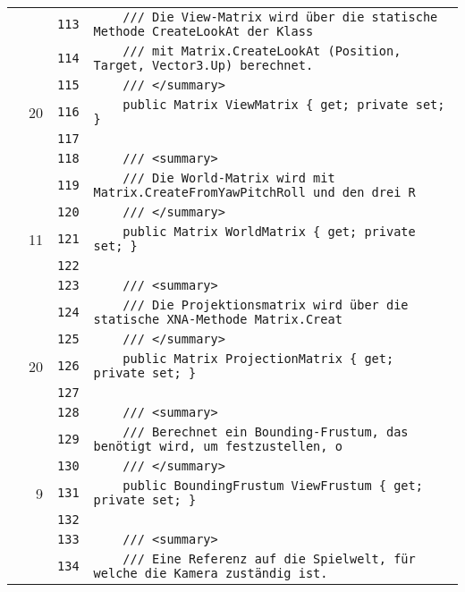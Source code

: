 \documentclass[a4paper,10pt]{article}
\begin{document}
\begin{longtable}[l]{lrrl}
\cellcolor{gray} &  & \verb~113~ & \verb~    /// Die View-Matrix wird über die statische Methode CreateLookAt der Klass~\\
\cellcolor{gray} &  & \verb~114~ & \verb~    /// mit Matrix.CreateLookAt (Position, Target, Vector3.Up) berechnet.~\\
\cellcolor{gray} &  & \verb~115~ & \verb~    /// </summary>~\\
\cellcolor{green} & 20 & \verb~116~ & \verb~    public Matrix ViewMatrix { get; private set; }~\\
\cellcolor{gray} &  & \verb~117~ & \verb~~\\
\cellcolor{gray} &  & \verb~118~ & \verb~    /// <summary>~\\
\cellcolor{gray} &  & \verb~119~ & \verb~    /// Die World-Matrix wird mit Matrix.CreateFromYawPitchRoll und den drei R~\\
\cellcolor{gray} &  & \verb~120~ & \verb~    /// </summary>~\\
\cellcolor{green} & 11 & \verb~121~ & \verb~    public Matrix WorldMatrix { get; private set; }~\\
\cellcolor{gray} &  & \verb~122~ & \verb~~\\
\cellcolor{gray} &  & \verb~123~ & \verb~    /// <summary>~\\
\cellcolor{gray} &  & \verb~124~ & \verb~    /// Die Projektionsmatrix wird über die statische XNA-Methode Matrix.Creat~\\
\cellcolor{gray} &  & \verb~125~ & \verb~    /// </summary>~\\
\cellcolor{green} & 20 & \verb~126~ & \verb~    public Matrix ProjectionMatrix { get; private set; }~\\
\cellcolor{gray} &  & \verb~127~ & \verb~~\\
\cellcolor{gray} &  & \verb~128~ & \verb~    /// <summary>~\\
\cellcolor{gray} &  & \verb~129~ & \verb~    /// Berechnet ein Bounding-Frustum, das benötigt wird, um festzustellen, o~\\
\cellcolor{gray} &  & \verb~130~ & \verb~    /// </summary>~\\
\cellcolor{green} & 9 & \verb~131~ & \verb~    public BoundingFrustum ViewFrustum { get; private set; }~\\
\cellcolor{gray} &  & \verb~132~ & \verb~~\\
\cellcolor{gray} &  & \verb~133~ & \verb~    /// <summary>~\\
\cellcolor{gray} &  & \verb~134~ & \verb~    /// Eine Referenz auf die Spielwelt, für welche die Kamera zuständig ist.~\\

\end{longtable}
\end{document}
